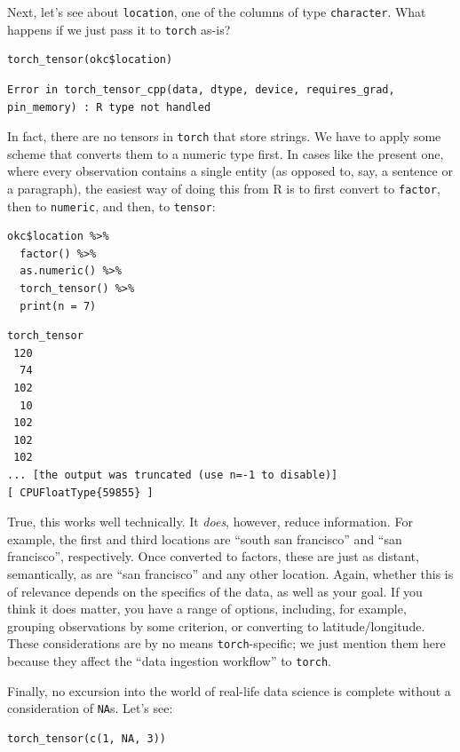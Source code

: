 \documentclass[
  letterpaper,
]{krantz}
\begin{document}
Next, let's see about \texttt{location}, one of the columns of type
\texttt{character}. What happens if we just pass it to \texttt{torch}
as-is?

\begin{verbatim}
torch_tensor(okc$location)
\end{verbatim}

\begin{verbatim}
Error in torch_tensor_cpp(data, dtype, device, requires_grad,
pin_memory) : R type not handled
\end{verbatim}

In fact, there are no tensors in \texttt{torch} that store strings. We
have to apply some scheme that converts them to a numeric type first. In
cases like the present one, where every observation contains a single
entity (as opposed to, say, a sentence or a paragraph), the easiest way
of doing this from R is to first convert to \texttt{factor}, then to
\texttt{numeric}, and then, to \texttt{tensor}:

\begin{verbatim}
okc$location %>%
  factor() %>%
  as.numeric() %>%
  torch_tensor() %>%
  print(n = 7)
\end{verbatim}

\begin{verbatim}
torch_tensor
 120
  74
 102
  10
 102
 102
 102
... [the output was truncated (use n=-1 to disable)]
[ CPUFloatType{59855} ]
\end{verbatim}

True, this works well technically. It \emph{does}, however, reduce
information. For example, the first and third locations are ``south san
francisco'' and ``san francisco'', respectively. Once converted to
factors, these are just as distant, semantically, as are ``san
francisco'' and any other location. Again, whether this is of relevance
depends on the specifics of the data, as well as your goal. If you think
it does matter, you have a range of options, including, for example,
grouping observations by some criterion, or converting to
latitude/longitude. These considerations are by no means
\texttt{torch}-specific; we just mention them here because they affect
the ``data ingestion workflow'' to \texttt{torch}.

Finally, no excursion into the world of real-life data science is
complete without a consideration of \texttt{NA}s. Let's see:

\begin{verbatim}
torch_tensor(c(1, NA, 3))
\end{verbatim}
\end{document}
